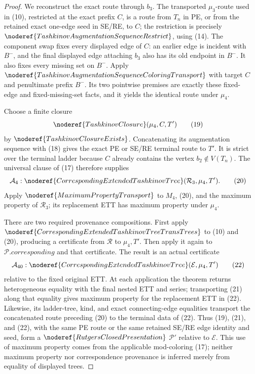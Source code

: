 \begin{proof}
We reconstruct the exact route through \(b_3\).  The transported
\(\mu_3\)-route used in (10), restricted at the exact prefix \(C\), is
a route from \(T_n\) in PE, or from the retained exact one-edge seed in
SE/RE, to \(C\); the restriction is precisely
\(\noderef{TashkinovAugmentationSequenceRestrict}\), using (14).
The component swap fixes every displayed edge of \(C\): an earlier edge
is incident with \(B^-\), and the final displayed edge attaching \(b_3\)
also has its old endpoint in \(B^-\).  It also fixes every missing set on
\(B^-\).  Apply
\(\noderef{TashkinovAugmentationSequenceColoringTransport}\) with target
\(C\) and penultimate prefix \(B^-\).  Its two pointwise premises are
exactly these fixed-edge and fixed-missing-set facts, and it yields the
identical route under \(\mu_4\).                                  \(\tag{18}\)

Choose a finite closure
\[
                    \noderef{TashkinovClosure}(\mu_4,C,T')    \tag{19}
\]
by \(\noderef{TashkinovClosureExists}\).  Concatenating its augmentation
sequence with (18) gives the exact PE or SE/RE terminal route to \(T'\).
It is strict over the terminal ladder because \(C\) already contains the
vertex \(b_2\notin V(T_n)\).  The universal clause of (17) therefore
supplies
\[
 \mathcal A_4:
 \noderef{CorrespondingExtendedTashkinovTree}
       (\mathcal R_3,\mu_4,T').                               \tag{20}
\]
Apply \(\noderef{MaximumPropertyTransport}\) to \(M_4\), (20), and the
maximum property of \(\mathcal R_3\); its replacement ETT has maximum
property under \(\mu_4\).                                    \(\tag{21}\)

There are two required provenance compositions.  First apply
\(\noderef{CorrespondingExtendedTashkinovTreeTransTrees}\) to (10) and
(20), producing a certificate from \(\mathcal R\) to \(\mu_4,T'\).
Then apply it again to \(\mathcal P.\mathit{corresponding}\) and that
certificate.  The result is an actual certificate
\[
 \mathcal A_{40}:
 \noderef{CorrespondingExtendedTashkinovTree}
       (\mathcal E,\mu_4,T')                                  \tag{22}
\]
relative to the fixed original ETT.  At each application the theorem
returns heterogeneous equality with the final nested ETT and series;
transporting (21) along that equality gives maximum property for the
replacement ETT in (22).  Likewise, its ladder-tree, kind, and exact
connecting-edge equalities transport the concatenated route preceding
(20) to the terminal data of (22).  Thus (19), (21), and (22), with the
same PE route or the same retained SE/RE edge identity and seed, form a
\(\noderef{RutgersClosedPresentation}\) \(\mathcal P'\) relative to
\(\mathcal E\).  This use of maximum property comes from the applicable
mod-coloring (17); neither maximum property nor correspondence provenance
is inferred merely from equality of displayed trees.


\end{proof}

